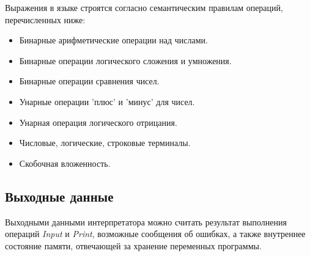 Выражения в языке строятся согласно семантическим правилам операций,
перечисленных ниже:
\begin{itemize}
    \item Бинарные арифметические операции над числами.

    \item Бинарные операции логического сложения и умножения.

    \item Бинарные операции сравнения чисел.
    
    \item Унарные операции 'плюс' и 'минус' для чисел.

    \item Унарная операция логического отрицания.
    
    \item Числовые, логические, строковые терминалы.
    
    \item Скобочная вложенность.
\end{itemize}

\subsection{Выходные данные}

Выходными данными интерпретатора можно считать
результат выполнения операций \emph{Input} и \emph{Print},
возможные сообщения об ошибках,
а также внутреннее состояние памяти, отвечающей за хранение
переменных программы.